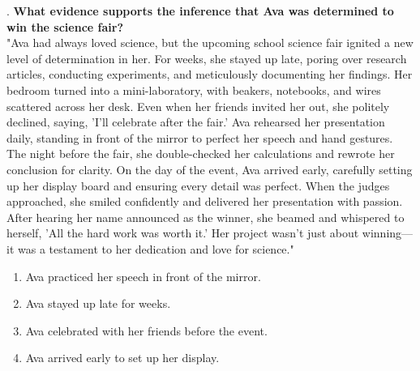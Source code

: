 \documentclass[12pt]{article}
\begin{document}
\vspace{1cm}
. \textbf{What evidence supports the inference that Ava was determined to win the science fair?\\}
"Ava had always loved science, but the upcoming school science fair ignited a new level of determination in her. For weeks, she stayed up late, poring over research articles, conducting experiments, and meticulously documenting her findings. Her bedroom turned into a mini-laboratory, with beakers, notebooks, and wires scattered across her desk. Even when her friends invited her out, she politely declined, saying, 'I’ll celebrate after the fair.' Ava rehearsed her presentation daily, standing in front of the mirror to perfect her speech and hand gestures. The night before the fair, she double-checked her calculations and rewrote her conclusion for clarity. On the day of the event, Ava arrived early, carefully setting up her display board and ensuring every detail was perfect. When the judges approached, she smiled confidently and delivered her presentation with passion. After hearing her name announced as the winner, she beamed and whispered to herself, 'All the hard work was worth it.' Her project wasn’t just about winning—it was a testament to her dedication and love for science."  
\begin{enumerate}[label=\Alph*.]
    \item Ava practiced her speech in front of the mirror.  
    \item Ava stayed up late for weeks.  
    \item Ava celebrated with her friends before the event.  
    \item Ava arrived early to set up her display.  
\end{enumerate}
\end{document}
